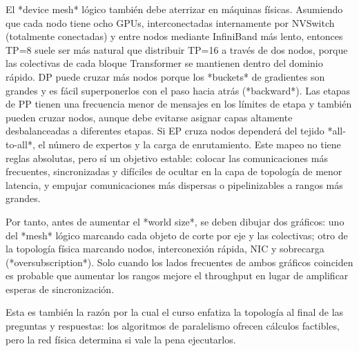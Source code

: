 El *device mesh* lógico también debe aterrizar en máquinas físicas. Asumiendo que cada nodo tiene ocho GPUs, interconectadas internamente por NVSwitch (totalmente conectadas) y entre nodos mediante InfiniBand más lento, entonces TP=8 suele ser más natural que distribuir TP=16 a través de dos nodos, porque las colectivas de cada bloque Transformer se mantienen dentro del dominio rápido. DP puede cruzar más nodos porque los *buckets* de gradientes son grandes y es fácil superponerlos con el paso hacia atrás (*backward*). Las etapas de PP tienen una frecuencia menor de mensajes en los límites de etapa y también pueden cruzar nodos, aunque debe evitarse asignar capas altamente desbalanceadas a diferentes etapas. Si EP cruza nodos dependerá del tejido *all-to-all*, el número de expertos y la carga de enrutamiento. Este mapeo no tiene reglas absolutas, pero sí un objetivo estable: colocar las comunicaciones más frecuentes, sincronizadas y difíciles de ocultar en la capa de topología de menor latencia, y empujar comunicaciones más dispersas o pipelinizables a rangos más grandes.

Por tanto, antes de aumentar el *world size*, se deben dibujar dos gráficos: uno del *mesh* lógico marcando cada objeto de corte por eje y las colectivas; otro de la topología física marcando nodos, interconexión rápida, NIC y sobrecarga (*oversubscription*). Solo cuando los lados frecuentes de ambos gráficos coinciden es probable que aumentar los rangos mejore el throughput en lugar de amplificar esperas de sincronización.

Esta es también la razón por la cual el curso enfatiza la topología al final de las preguntas y respuestas: los algoritmos de paralelismo ofrecen cálculos factibles, pero la red física determina si vale la pena ejecutarlos.

